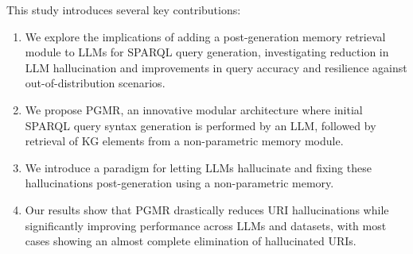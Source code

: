 This study introduces several key contributions:
\begin{enumerate}
    \item We explore the implications of adding a post-generation memory retrieval module to LLMs for SPARQL query generation, investigating reduction in LLM hallucination and improvements in query accuracy and resilience against out-of-distribution scenarios.
    \item We propose PGMR, an innovative modular architecture where initial SPARQL query syntax generation is performed by an LLM, followed by retrieval of KG elements from a non-parametric memory module.
    \item We introduce a paradigm for letting LLMs hallucinate and fixing these hallucinations post-generation using a non-parametric memory.
    \item Our results show that PGMR drastically reduces URI hallucinations while significantly improving performance across LLMs and datasets, with most cases showing an almost complete elimination of hallucinated URIs.
    

    
\end{enumerate}


